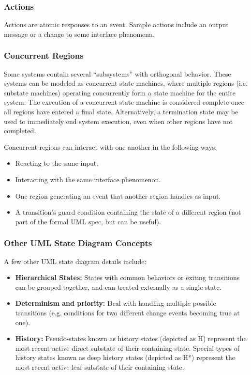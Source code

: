 \documentclass[12pt,titlepage]{article}
\begin{document}
      \subsubsection{Actions}
        Actions are atomic responses to an event. Sample actions include an output message or a change to some interface phenomena.

      \subsubsection{Concurrent Regions}
        Some systems contain several ``subsystems'' with orthogonal behavior. These systems can be modeled as concurrent state machines, where multiple
        regions (i.e. substate machines) operating concurrently form a state machine for the entire system. The execution of a concurrent state machine
        is considered complete once all regions have entered a final state. Alternatively, a termination state may be used to immediately end system
        execution, even when other regions have not completed.

        Concurrent regions can interact with one another in the following ways:
        \begin{itemize}
          \item Reacting to the same input.
          \item Interacting with the same interface phenomenon.
          \item One region generating an event that another region handles as input.
          \item A transition's guard condition containing the state of a different region (not part of the formal UML spec, but can be useful).
        \end{itemize}

      \subsubsection{Other UML State Diagram Concepts}
        A few other UML state diagram details include:
        \begin{itemize}
          \item \textbf{Hierarchical States:} States with common behaviors or exiting transitions can be grouped together, and can treated externally as a
            single state.
          \item \textbf{Determinism and priority:} Deal with handling multiple possible transitions (e.g. conditions for two different change events
            becoming true at one).
          \item \textbf{History:} Pseudo-states known as history states (depicted as H) represent the most recent active direct substate of their containing state.
            Special types of history states known as deep history states (depicted as H*) represent the most recent active leaf-substate of their containing state.
        \end{itemize}
\end{document}
